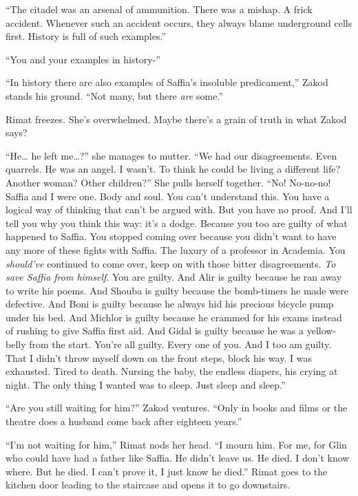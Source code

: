\documentclass[twoside,11pt]{book}
\begin{document}
``The citadel was an arsenal of ammunition. There was a mishap. A frick accident. Whenever such an accident
occurs, they always blame underground cells first. History is full of such examples.''

``You and your examples in history-''

``In history there are also examples of Saffia's insoluble predicament,'' Zakod stands his
ground. ``Not many, but there \textit{are} some.''

Rimat freezes. She's overwhelmed. Maybe there's a grain of truth in what Zakod says? \

``He{\dots} he left me{\dots}?'' she manages to mutter. ``We had our disagreements. Even quarrels. He was
an angel. I wasn't. To think he could be living a different life? Another woman? Other children?'' She
pulls herself together. ``No! No-no-no! Saffia and I were one. Body and soul.  You can't understand this.
You have a logical way of thinking that can't be argued with. But you have no proof. And I'll tell you why you think
this way: it's a dodge. Because you too are guilty of what happened to Saffia. You stopped coming over because you
didn't want to have any more of these fights with Saffia. The luxury of a professor in Academia. You \textit{should've}
continued to come over, keep on with those bitter disagreements. \textit{To save Saffia from himself}. You are
guilty. And Alir is guilty because he ran away to write his poems. And Shouba is guilty because the bomb-timers he made
were defective. And Boni is guilty because he always hid his precious bicycle pump under his bed. And Michlor is guilty
because he crammed for his exams instead of rushing to give Saffia first aid. And Gidal is guilty because he was a
yellow-belly from the start. You're all guilty. Every one of you. And I too am guilty. That I didn't throw myself down
on the front steps, block his way. I was exhausted. Tired to death. Nursing the baby, the endless diapers, his crying
at night. The only thing I wanted was to sleep. Just sleep and sleep.''

``Are you still waiting for him?'' Zakod ventures. ``Only in books and films or
the theatre does a husband come back after eighteen years.''

``I'm not waiting for him,'' Rimat nods her head. ``I mourn him. For me, for Glin
who could have had a father like Saffia. He didn't leave us. He died. I don't know where. But he died. I can't prove
it, I just know he died.'' Rimat goes to the kitchen door leading to the staircase and opens it to go
downstairs.
\end{document}
